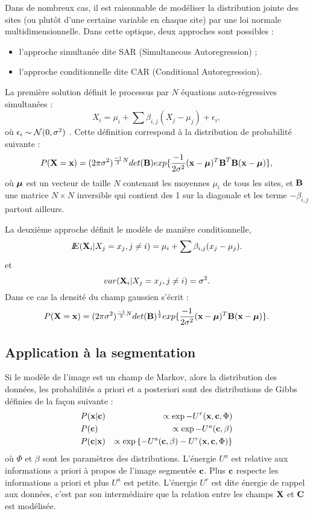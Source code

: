 Dans de nombreux cas, il est raisonnable de mod\'eliser la distribution
jointe des sites (ou plut\^ot d'une certaine variable en chaque site)
par une loi normale multidimensionnelle. Dans cette optique, deux
approches sont possibles :
\begin{itemize}
\item l'approche simultan\'ee dite SAR (Simultaneous Autoregression) ;
\item l'approche conditionnelle dite CAR (Conditional Autoregression).
\end{itemize} 

La premi\`ere solution d\'efinit le processus par $N$ \'equations 
auto-r\'egressives simultan\'ees :
\begin{equation}
X_i=\mu_i + \sum \beta_{i,j} (X_j-\mu_j)+\epsilon_i, 
\end{equation}
o\`u $\epsilon_i \sim {\cal N}(0,\sigma^2)$ \cite{Besag1974}.
Cette d\'efinition correspond \`a la distribution de probabilit\'e
suivante :
\begin{equation}
P(\mbox{\bf X}=\mbox{\bf x})=(2\pi\sigma^2)^{\frac{-1}{2}N} det(\mbox{\bf B})  
 exp\{\frac{-1}{2\sigma^2}(\mbox{\bf x}-\mbox{\boldmath $\mu$})^T\mbox{\bf B}^T \mbox{\bf B}(\mbox{\bf x}-\mbox{\boldmath $\mu$})\},
\end{equation}
o\`u $\mbox{\boldmath $\mu$}$ est un vecteur de taille $N$ contenant les moyennes $\mu_i$ de 
tous les sites, et $\mbox{\bf B}$ une matrice $N \times N$ inversible qui contient
des 1 sur la diagonale et les terme $-\beta_{i,j}$ partout ailleurs.


La deuxi\`eme approche d\'efinit le mod\`ele de mani\`ere  conditionnelle,
$$
I\!\!E(\mbox{\bf X}_i | X_j=x_j, j\neq i)=\mu_i + \sum \beta_{i,j} (x_j-\mu_j).
$$
et 
$$
var(\mbox{\bf X}_i | X_j=x_j, j\neq i)=\sigma^2.
$$
Dans ce cas la densit\'e du champ gaussien s'\'ecrit :
\begin{equation}
P(\mbox{\bf X}=\mbox{\bf x})=(2\pi\sigma^2)^{\frac{-1}{2}N} det(\mbox{\bf B})^{\frac{1}{2}} 
 exp\{\frac{-1}{2\sigma^2}(\mbox{\bf x}-\mbox{\boldmath $\mu$})^T\mbox{\bf B}(\mbox{\bf x}-\mbox{\boldmath $\mu$})\}.
\end{equation}


\subsection{Application \`a la segmentation}

Si le mod\`ele de l'image est un champ de Markov, alors la distribution des donn\'ees,
les probabilit\'es a priori et a posteriori sont des distributions
de Gibbs d\'efinies de la fa\c{c}on suivante :
\begin{eqnarray*}
& P(\mbox{\bf x} | \mbox{\bf c})    & \propto \exp{-U^r(\mbox{\bf x},\mbox{\bf c},\Phi)}\\
& P(\mbox{\bf c})         & \propto \exp{-U^a(\mbox{\bf c},\beta)}\\
& P(\mbox{\bf c} | \mbox{\bf x})    & \propto \exp{\{-U^a(\mbox{\bf c},\beta)-U^r(\mbox{\bf x},\mbox{\bf c},\Phi)\}}\\
\end{eqnarray*}  
o\`u $\Phi$ et $\beta$ sont les param\`etres des distributions. 
L'\'energie $U^a$ est relative aux informations a priori \`a propos de l'image
segment\'ee $\mbox{\bf c}$. Plus $\mbox{\bf c}$ respecte les informations a priori et 
plus $U^a$ est petite. L'\'energie $U^r$ est dite \'energie de rappel 
aux donn\'ees, c'est
par son interm\'ediaire que la relation entre les champs $\mbox{\bf X}$ et $\mbox{\bf C}$ est
mod\'elis\'ee. 

